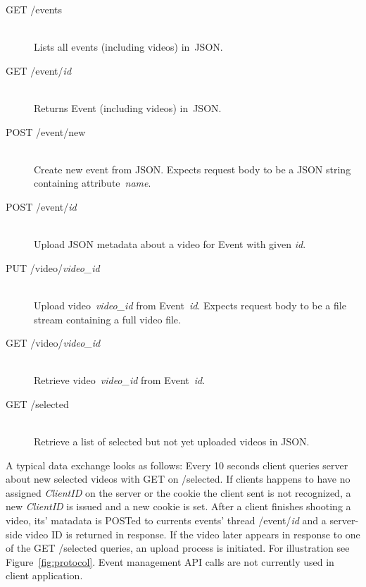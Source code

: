 \documentclass[conference]{IEEEtran}
\begin{document}
\begin{description}
	\item[GET /events]\hfill\\
		Lists all events (including videos) in~JSON.
		
	\item[GET /event/\textit{id}]\hfill\\
		Returns Event (including videos) in~JSON.
				
	\item[POST /event/new]\hfill\\
		Create new event from JSON.
		Expects request body to be a JSON string containing attribute~\textit{name}.
		
	\item[POST /event/\textit{id}]\hfill\\
		Upload JSON metadata about a video for Event with given \textit{id}.
		
	\item[PUT /video/\textit{video\_id}]\hfill\\
		Upload video~\textit{video\_id} from Event~\textit{id}.
		Expects request body to be a file stream containing a full video file.
		
	\item[GET /video/\textit{video\_id}]\hfill\\
		Retrieve video~\textit{video\_id} from Event~\textit{id}.
		
	\item[GET /selected]\hfill\\
		Retrieve a list of selected but not yet uploaded videos in JSON.	
		
\end{description}

A typical data exchange looks as follows:
Every 10 seconds client queries server about new selected videos with GET on /selected.
If clients happens to have no assigned \textsl{ClientID} on the server or the cookie the client 
sent is not recognized, a new \textsl{ClientID} is issued and a new cookie is set.
After a client finishes shooting a video, its' matadata is POSTed to currents events' thread /event/\textit{id}
and a server-side video ID is returned in response.
If the video later appears in response to one of the GET /selected queries, an upload process is initiated.
For illustration see Figure~\ref{fig:protocol}.
Event management API calls are not currently used in client application.
\end{document}
